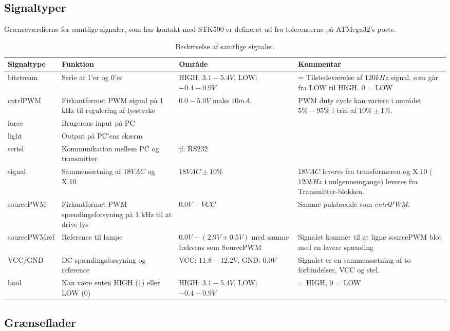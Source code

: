 \subsection{Signaltyper}
Grænseværdierne for samtlige signaler, som har kontakt med STK500 er defineret ud fra tolerencerne på ATMega32's porte\cite{lib:AtMega32}.
\begin{table}[h]
\centering
\begin{tabularx}{\textwidth}{| l | >{\raggedright}X | >{\raggedright}X | >{\raggedright\arraybackslash}X |}
\hline
	Signaltype & Funktion & Område & Kommentar \\ \hline
	bitstream & Serie af 1'er og 0'er & HIGH: $3.1 - 5.4V$, LOW: $-0.4 - 0.9V$ & 1 = Tilstedeværelse af $120 kHz$ signal, som går fra LOW til HIGH. 0 = LOW \\ \hline
	cntrlPWM & Firkantformet PWM signal på 1 kHz til regulering af lysstyrke & $0.0 - 5.0 V$ maks $10 mA$.  & PWM duty cycle kan variere i området $5\%-95\%$ i trin af $10\% \pm 1\%$.  \\ \hline
	force & Brugerens input på PC & \  & \  \\ \hline
	light & Output på PC'ens skærm & \  & \  \\ \hline
	seriel & Kommunikation mellem PC og transmitter & jf. RS232 & \  \\ \hline
	signal & Sammensætning af $18V AC$  og X.10 & $18V AC \pm 10\%$ \cite{lib:Adaptor} & $18V AC$ leveres fra transformeren og X.10 ($120 kHz$ i nulgennemgange) leveres fra Transmitter-blokken.  \\ \hline
	sourcePWM & Firkantformet PWM spændingsforsyning på 1 kHz til at drive lys & $0.0V - VCC$ & Samme pulsbredde som \emph{cntrlPWM}.  \\ \hline	
	sourcePWMref & Reference til lampe & $0.0V - (2.9V \pm 0.5V)$ med samme frekvens som SourcePWM & Signalet kommer til at ligne sourcePWM blot med en lavere spænding \\ \hline
	VCC/GND & DC spændingsforsyning og reference & VCC: $11.8 - 12.2V$, GND: $0.0V$ & Signalet er en sammensætning af to forbindelser, VCC og stel. \\ \hline
	bool & Kan være enten HIGH (1) eller LOW (0) & HIGH: $3.1 - 5.4V$, LOW: $-0.4 - 0.9V$ & 1 = HIGH, 0 = LOW \\ \hline
\end{tabularx}
\caption{Beskrivelse af samtlige signaler.}
\label{tbl:signalbeskriv}
\end{table}
\clearpage
\subsection{Grænseflader}

